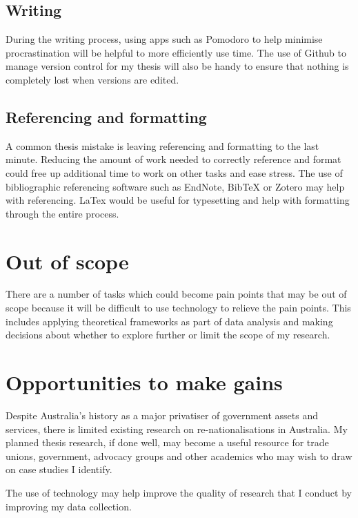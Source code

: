 \documentclass[a4paper]{article}
\begin{document}
\subsection*{Writing}
During the writing process, using apps such as Pomodoro to help minimise procrastination will be helpful to more efficiently use time. The use of Github to manage version control for my thesis will also be handy to ensure that nothing is completely lost when versions are edited.\par
\subsection*{Referencing and formatting}
A common thesis mistake is leaving referencing and formatting to the last minute. Reducing the amount of work needed to correctly reference and format could free up additional time to work on other tasks and ease stress. The use of bibliographic referencing software such as EndNote, BibTeX or Zotero may help with referencing. LaTex would be useful for typesetting and help with formatting through the entire process.\par

\section*{Out of scope}

There are a number of tasks which could become pain points that may be out of scope because it will be difficult to use technology to relieve the pain points. This includes applying theoretical frameworks as part of data analysis and making decisions about whether to explore further or limit the scope of my research.

\section*{Opportunities to make gains}

Despite Australia's history as a major privatiser of government assets and services, there is limited existing research on re-nationalisations in Australia. My planned thesis research, if done well, may become a useful resource for trade unions, government, advocacy groups and other academics who may wish to draw on case studies I identify.\par
The use of technology may help improve the quality of research that I conduct by improving my data collection.\par
\end{document}
